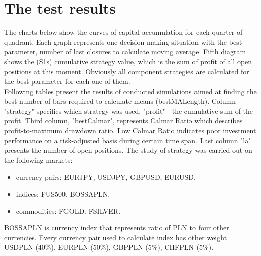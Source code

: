 \section{The test results}
\label{sec:c3TheTestResults}
\indent The charts below show the curves of capital accumulation for each quarter of quadrant. Each graph represents one decision-making situation with the best parameter, number of last closures to calculate moving average. Fifth diagram shows the (S1s) cumulative strategy value, which is the sum of profit of all open positions at this moment. Obviously all component strategies are calculated for the best parameter for each one of them.\\
\indent Following tables present the results of conducted simulations aimed at finding the best number of bars required to calculate means (bestMALength). Column "strategy" specifies which strategy was used, "profit" - the cumulative sum of the profit. Third column, "bestCalmar", represents Calmar Ratio which describes profit-to-maximum drawdown ratio. Low Calmar Ratio indicates poor investment performance on a risk-adjusted basis during certain time span. Last column "la" presents the number of open positions.
The study of strategy was carried out on the following markets:
\begin{itemize}
\item currency pairs: EURJPY, USDJPY, GBPUSD, EURUSD,
\item indices: FUS500, BOSSAPLN,
\item commodities: FGOLD. FSILVER.
\end{itemize}
BOSSAPLN is currency index that represents ratio of PLN to four other currencies. Every currency pair used to calculate index has other weight USDPLN (40\%), EURPLN (50\%), GBPPLN (5\%), CHFPLN (5\%).
\newpage
